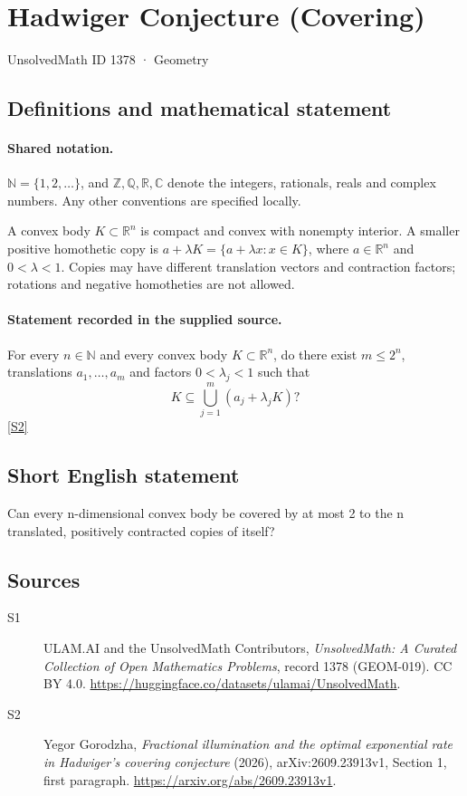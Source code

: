\documentclass[11pt]{article}
\newcommand{\sref}[2]{\hyperlink{source:#1:#2}{[S#2]}}
\begin{document}
\setcounter{section}{1377}
\section{Hadwiger Conjecture (Covering)}\label{1378}
{\small\sffamily UnsolvedMath ID 1378 · Geometry}
\subsection{Definitions and mathematical statement}

\paragraph{Shared notation.}$\mathbb N=\{1,2,\ldots\}$, and $\mathbb Z,\mathbb Q,\mathbb R,\mathbb C$ denote the integers, rationals, reals and complex numbers. Any other conventions are specified locally.


A convex body $K\subset\mathbb R^n$ is compact and convex with nonempty interior. A smaller positive homothetic copy is $a+\lambda K=\{a+\lambda x:x\in K\}$, where $a\in\mathbb R^n$ and $0<\lambda<1$. Copies may have different translation vectors and contraction factors; rotations and negative homotheties are not allowed.
\paragraph{Statement recorded in the supplied source.}
For every $n\in\mathbb N$ and every convex body $K\subset\mathbb R^n$, do there exist $m\le2^n$, translations $a_1,\ldots,a_m$ and factors $0<\lambda_j<1$ such that
\[
 K\subseteq\bigcup_{j=1}^{m}(a_j+\lambda_jK)?
\]
\sref{1378}{2}
\subsection{Short English statement}
Can every n-dimensional convex body be covered by at most 2 to the n translated, positively contracted copies of itself?
\subsection{Sources}
\begin{description}
\item[\hypertarget{source:1378:1}{S1}] ULAM.AI and the UnsolvedMath Contributors, \emph{UnsolvedMath: A Curated Collection of Open Mathematics Problems}, record 1378 (GEOM-019). CC BY 4.0. \url{https://huggingface.co/datasets/ulamai/UnsolvedMath}.
\item[\hypertarget{source:1378:2}{S2}] Yegor Gorodzha, \emph{Fractional illumination and the optimal exponential rate in Hadwiger's covering conjecture} (2026), arXiv:2609.23913v1, Section 1, first paragraph. \url{https://arxiv.org/abs/2609.23913v1}.
\end{description}
\label{end:1378}
\end{document}
